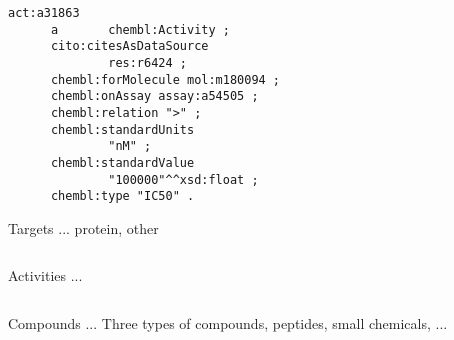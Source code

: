 \documentclass[sw]{iosart2c}
\begin{document}
\begin{small}
\begin{verbatim}
act:a31863
      a       chembl:Activity ;
      cito:citesAsDataSource
              res:r6424 ;
      chembl:forMolecule mol:m180094 ;
      chembl:onAssay assay:a54505 ;
      chembl:relation ">" ;
      chembl:standardUnits
              "nM" ;
      chembl:standardValue
              "100000"^^xsd:float ;
      chembl:type "IC50" .
\end{verbatim}
\end{small}

Targets ... protein, other

\begin{verbatim}
\end{verbatim}

Activities ...

\begin{verbatim}
\end{verbatim}

Compounds ... Three types of compounds, peptides, small chemicals, ...
\end{document}
